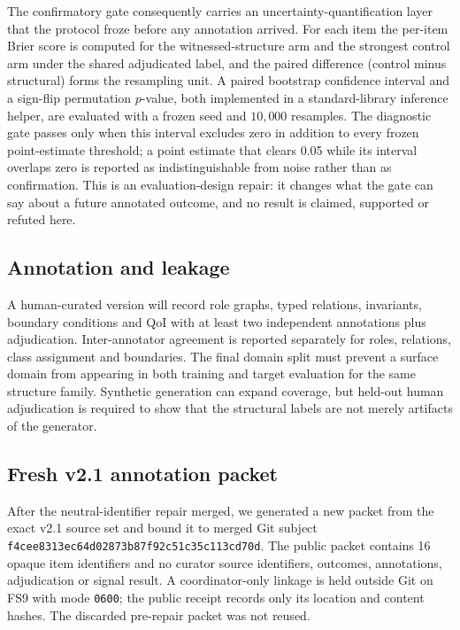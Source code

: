 The confirmatory gate consequently carries an uncertainty-quantification layer that the protocol froze before any annotation arrived. For each item the per-item Brier score is computed for the witnessed-structure arm and the strongest control arm under the shared adjudicated label, and the paired difference (control minus structural) forms the resampling unit. A paired bootstrap confidence interval and a sign-flip permutation $p$-value, both implemented in a standard-library inference helper, are evaluated with a frozen seed and $10{,}000$ resamples. The diagnostic gate passes only when this interval excludes zero in addition to every frozen point-estimate threshold; a point estimate that clears 0.05 while its interval overlaps zero is reported as indistinguishable from noise rather than as confirmation. This is an evaluation-design repair: it changes what the gate can say about a future annotated outcome, and no result is claimed, supported or refuted here.

\subsection{Annotation and leakage}

A human-curated version will record role graphs, typed relations, invariants, boundary conditions and QoI with at least two independent annotations plus adjudication. Inter-annotator agreement is reported separately for roles, relations, class assignment and boundaries. The final domain split must prevent a surface domain from appearing in both training and target evaluation for the same structure family. Synthetic generation can expand coverage, but held-out human adjudication is required to show that the structural labels are not merely artifacts of the generator.

\subsection{Fresh v2.1 annotation packet}
After the neutral-identifier repair merged, we generated a new packet from the exact v2.1 source set and bound it to merged Git subject \texttt{f4cee8313ec64d02873b87f92c51c35c113cd70d}. The public packet contains 16 opaque item identifiers and no curator source identifiers, outcomes, annotations, adjudication or signal result. A coordinator-only linkage is held outside Git on FS9 with mode \texttt{0600}; the public receipt records only its location and content hashes. The discarded pre-repair packet was not reused.

